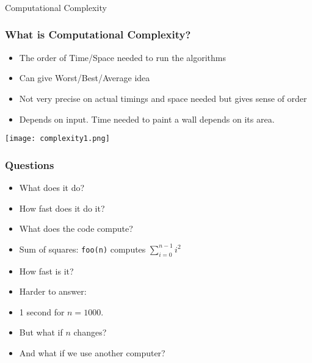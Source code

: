 \begin{frame}[fragile]\frametitle{}
\begin{center}
{\Large Computational Complexity}
\end{center}

\end{frame}

\begin{frame}[fragile]
	\frametitle{What is Computational Complexity?}
		\begin{itemize}
			\item The order of Time/Space needed to run the algorithms
			\item Can give Worst/Best/Average idea
			\item Not very precise on actual timings and space needed but gives sense of order
			\item Depends on input. Time needed to paint a wall depends on its area.
		\end{itemize}
		
\begin{center}
\texttt{[image: complexity1.png]}
\end{center}

\end{frame}



\begin{frame}
	\frametitle{Questions}

		
			\begin{itemize}
			\item What does it do?
			\item How fast does it do it?
			\item What does the code compute?
			\item Sum of squares: \texttt{foo(n)} computes $\sum\limits_{i=0}^{n-1} i^2$
			\item How fast is it?
			\item Harder to answer:
			\item 1 second for $n=1000$.
			\item But what if $n$ changes?
			\item And what if we use another computer?
	\end{itemize}
	
		
	
\end{frame}

